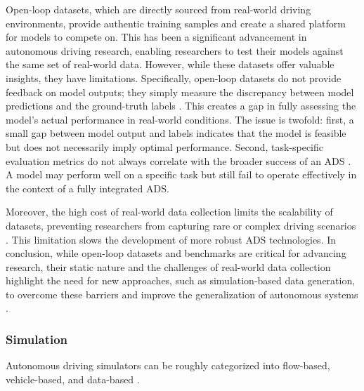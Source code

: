 Open-loop datasets, which are directly sourced from real-world driving environments, provide authentic training samples and create a shared platform for models to compete on. This has been a significant advancement in autonomous driving research, enabling researchers to test their models against the same set of real-world data. However, while these datasets offer valuable insights, they have limitations. Specifically, open-loop datasets do not provide feedback on model outputs; they simply measure the discrepancy between model predictions and the ground-truth labels \citep{codevilla2019exploring,caesar2021nuplan}. This creates a gap in fully assessing the model’s actual performance in real-world conditions. The issue is twofold: first, a small gap between model output and labels indicates that the model is feasible but does not necessarily imply optimal performance. Second, task-specific evaluation metrics do not always correlate with the broader success of an ADS \citep{zhang2022rethinking,ljungbergh2025neuroncap,yang2024drivearena}. A model may perform well on a specific task but still fail to operate effectively in the context of a fully integrated ADS.

Moreover, the high cost of real-world data collection limits the scalability of datasets, preventing researchers from capturing rare or complex driving scenarios \citep{chitta2022transfuser,shao2023safety}. This limitation slows the development of more robust ADS technologies. In conclusion, while open-loop datasets and benchmarks are critical for advancing research, their static nature and the challenges of real-world data collection highlight the need for new approaches, such as simulation-based data generation, to overcome these barriers and improve the generalization of autonomous systems \citep{hu2023simulation,tian2024robust}.

\subsubsection{Simulation}

Autonomous driving simulators can be roughly categorized into flow-based, vehicle-based, and data-based \citep{wenl2023limsim}.

